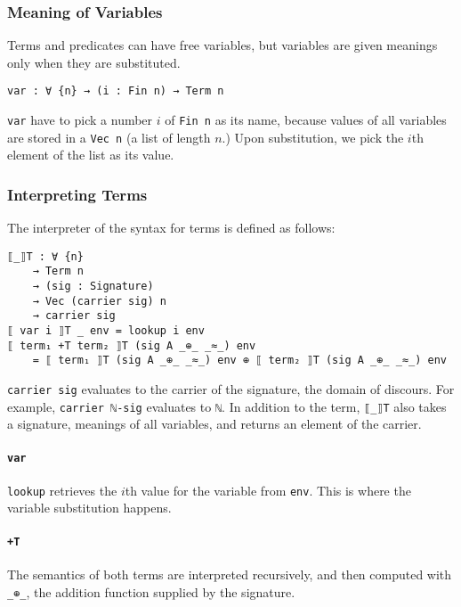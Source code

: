 \documentclass[\main/thesis.tex]{subfiles}
\begin{document}
\subsubsection{Meaning of Variables}

Terms and predicates can have free variables, but variables are given
meanings only when they are substituted.

\begin{lstlisting}
var : ∀ {n} → (i : Fin n) → Term n
\end{lstlisting}

\lstinline|var| have to pick a number $ i $ of \lstinline|Fin n| as its name,
because values of all variables are stored in a \lstinline|Vec n| (a list of length $ n $.)
Upon substitution, we pick the $ i $th element of the list as its value.

\subsubsection{Interpreting Terms}

The interpreter of the syntax for terms is defined as follows:

\begin{lstlisting}[basicstyle=\ttfamily\scriptsize]
⟦_⟧T : ∀ {n}
    → Term n
    → (sig : Signature)
    → Vec (carrier sig) n
    → carrier sig
⟦ var i ⟧T _ env = lookup i env
⟦ term₁ +T term₂ ⟧T (sig A _⊕_ _≈_) env
    = ⟦ term₁ ⟧T (sig A _⊕_ _≈_) env ⊕ ⟦ term₂ ⟧T (sig A _⊕_ _≈_) env
\end{lstlisting}

\lstinline|carrier sig| evaluates to the carrier of the signature, the domain
of discours. For example, \lstinline|carrier ℕ-sig| evaluates to \lstinline|ℕ|.
In addition to the term, \lstinline|⟦_⟧T| also takes a signature, meanings of
all variables, and returns an element of the carrier.

\paragraph{\lstinline|var|}
\lstinline|lookup| retrieves the $i$th value for the variable from \lstinline|env|.
This is where the variable substitution happens.

\paragraph{\lstinline|+T|}
The semantics of both terms are interpreted recursively,
and then computed with \lstinline|_⊕_|,
the addition function supplied by the signature.
\end{document}

